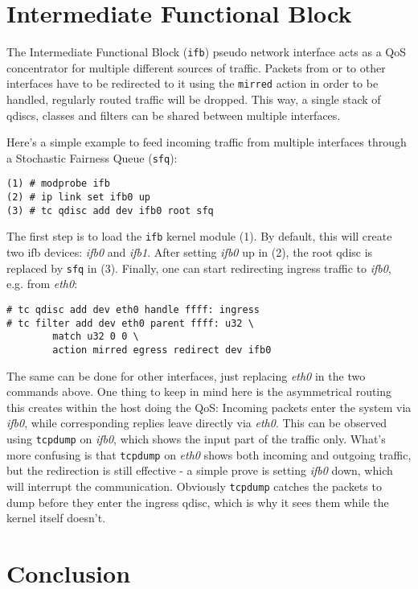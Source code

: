 \documentclass[12pt,twoside]{article}
\newcommand{\iface}{\textit}
\newcommand{\cmd}{\texttt}
\newcommand{\qdisc}{\texttt}
\begin{document}
\section*{Intermediate Functional Block}

The Intermediate Functional Block (\texttt{ifb}) pseudo network interface acts as a QoS
concentrator for multiple different sources of traffic. Packets from or to other
interfaces have to be redirected to it using the \texttt{mirred} action in order to be
handled, regularly routed traffic will be dropped. This way, a single stack of
qdiscs, classes and filters can be shared between multiple interfaces.

Here's a simple example to feed incoming traffic from multiple interfaces
through a Stochastic Fairness Queue (\qdisc{sfq}):
\begin{Verbatim}
(1) # modprobe ifb
(2) # ip link set ifb0 up
(3) # tc qdisc add dev ifb0 root sfq
\end{Verbatim}
The first step is to load the \texttt{ifb} kernel module (1). By default, this will
create two ifb devices: \iface{ifb0} and \iface{ifb1}. After setting
\iface{ifb0} up in (2), the root
qdisc is replaced by \qdisc{sfq} in (3). Finally, one can start redirecting ingress
traffic to \iface{ifb0}, e.g. from \iface{eth0}:
\begin{Verbatim}
# tc qdisc add dev eth0 handle ffff: ingress
# tc filter add dev eth0 parent ffff: u32 \
        match u32 0 0 \
        action mirred egress redirect dev ifb0
\end{Verbatim}
The same can be done for other interfaces, just replacing \iface{eth0} in the two
commands above. One thing to keep in mind here is the asymmetrical routing this
creates within the host doing the QoS: Incoming packets enter the system via
\iface{ifb0}, while corresponding replies leave directly via \iface{eth0}. This can be observed
using \cmd{tcpdump} on \iface{ifb0}, which shows the input part of the traffic only. What's
more confusing is that \cmd{tcpdump} on \iface{eth0} shows both incoming and outgoing traffic,
but the redirection is still effective - a simple prove is setting
\iface{ifb0} down,
which will interrupt the communication. Obviously \cmd{tcpdump} catches the packets to
dump before they enter the ingress qdisc, which is why it sees them while the
kernel itself doesn't.


\section*{Conclusion}
\end{document}
